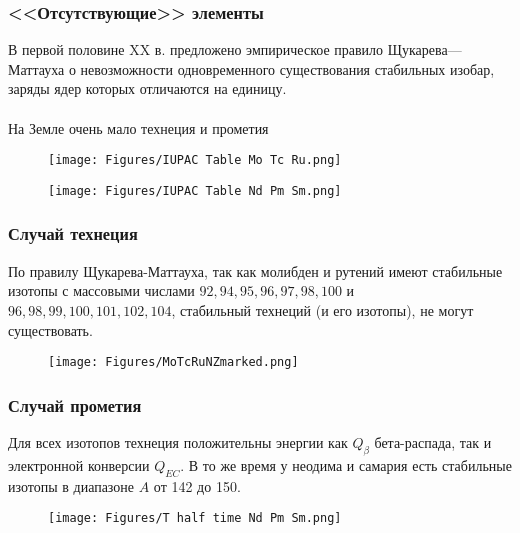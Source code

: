 \begin{frame}
\frametitle{<<Отсутствующие>> элементы}

 В первой половине XX в. предложено эмпирическое правило Щукарева—Маттауха о невозможности одновременного существования стабильных изобар, заряды ядер которых отличаются на единицу.\\
 ~\\
На Земле очень мало технеция и прометия

\begin{figure}[ht] 
	\centering\small
	\unitlength=1mm
	\texttt{[image: Figures/IUPAC Table Mo Tc Ru.png]} 
	\label{f:IUPAC Table Mo Tc Ru}
\end{figure}

\begin{figure}[ht] 
	\centering\small
	\unitlength=1mm
	\texttt{[image: Figures/IUPAC Table Nd Pm Sm.png]} 
	\label{f:IUPAC Table  Nd Pm Sm}
\end{figure}
\end{frame}

\begin{frame}
\frametitle{Случай технеция}

По правилу Щукарева-Маттауха, так как молибден и рутений имеют стабильные изотопы с массовыми числами $92, 94, 95, 96, 97, 98, 100$ и $96, 98, 99, 100, 101, 102, 104$, стабильный технеций (и его изотопы), не могут существовать.

\begin{figure}[ht] 
	\centering\small
	\unitlength=1mm
	\texttt{[image: Figures/MoTcRuNZmarked.png]} 
	\label{f:T half time Mo Tc Ru.png}
\end{figure}




\end{frame}

\begin{frame}
\frametitle{Случай прометия}

Для всех изотопов технеция положительны энергии как $Q_{\beta}$ бета-распада, так и электронной конверсии $Q_{EC}$. 
В то же время у неодима и самария есть стабильные изотопы в диапазоне $A$ от 142 до 150.
\begin{figure}[ht] 
	\centering\small
	\unitlength=1mm
	\texttt{[image: Figures/T half time Nd Pm Sm.png]} 
	\label{f:T half time MNd Pm Sm.png}
\end{figure}


\end{frame}

